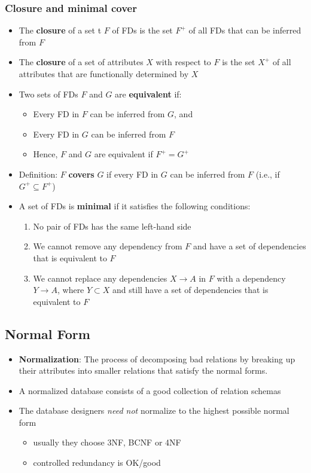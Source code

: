 \subsubsection{Closure and minimal cover}
\begin{itemize}[label=\(\rhd\)]
    \item The \textbf{closure} of a set t $F$ of FDs is the set $F^{+}$ of all FDs that can be inferred from $F$
    \item The \textbf{closure} of a set of attributes $X$ with respect to $F$ is the set $X^+$ of all attributes that are functionally determined by $X$
    \item Two sets of FDs $F$ and $G$ are \textbf{equivalent} if:
    \begin{itemize}[label=\(\rhd\)]
        \item Every FD in $F$ can be inferred from $G$, and
        \item Every FD in $G$ can be inferred from $F$
        \item Hence, $F$ and $G$ are equivalent if $F^+ = G^+$
    \end{itemize}
    \item Definition: $F$ \textbf{covers} $G$ if every FD in $G$ can be inferred from $F$ (i.e., if $G^+ \subseteq F^+$)
    \item A set of FDs is \textbf{minimal} if it satisfies the following conditions:
    \begin{enumerate}
        \item No pair of FDs has the same left-hand side 
        \item We cannot remove any dependency from $F$ and have a set of dependencies that is equivalent to $F$ 
        \item We cannot replace any dependencies $X\rightarrow A$ in $F$ with a dependency $Y\rightarrow A$, where $Y\subset X$ and still have a set of dependencies that is equivalent to $F$
    \end{enumerate}
\end{itemize}

\subsection{Normal Form}
\begin{itemize}[label=\(\rhd\)]
    \item \textbf{Normalization}: The process of decomposing bad relations by breaking up their attributes into smaller relations that satisfy the normal forms. 
    \item A normalized database consists of a good collection of relation schemas
    \item The database designers \textit{need not} normalize to the highest possible normal form
    \begin{itemize}[label=\(\rhd\)]
        \item usually they choose 3NF, BCNF or 4NF 
        \item controlled redundancy is OK/good
    \end{itemize}
\end{itemize}

